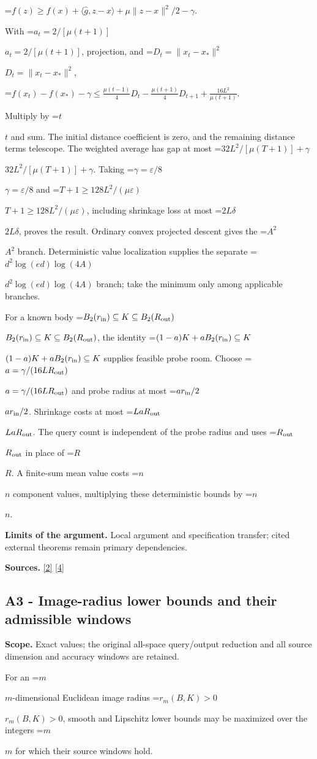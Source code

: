 \documentclass[10pt,a4paper]{article}
\newcommand{\AtlasMath}[1]{\par\begingroup\centering\setbox0=\hbox{$\displaystyle #1$}\ifdim\wd0>1.4\linewidth\typeout{ATLAS WIDE FORMULA: \the\wd0}\fi\ifdim\wd0>\linewidth\resizebox{\linewidth}{!}{\box0}\else\box0\fi\par\endgroup}
\newcommand{\AtlasInlineMath}[1]{\begingroup\setbox0=\hbox{$#1$}\ifdim\wd0>.4\linewidth\endgroup\AtlasMath{#1}\else\endgroup$#1$\fi}
\begin{document}
\AtlasMath{f(z)\ge f(x)+\langle\widehat g,z-x\rangle+\mu\|z-x\|^2/2-\gamma.}

With \AtlasInlineMath{a_t=2/[\mu(t+1)]}, projection, and \AtlasInlineMath{D_t=\|x_t-x_*\|^2},

\AtlasMath{f(x_t)-f(x_*)-\gamma\le\frac{\mu(t-1)}4D_t-\frac{\mu(t+1)}4D_{t+1}+\frac{16L^2}{\mu(t+1)}.}

Multiply by \AtlasInlineMath{t} and sum. The initial distance coefficient is zero, and the remaining distance terms telescope. The weighted average has gap at most \AtlasInlineMath{32L^2/[\mu(T+1)]+\gamma}. Taking \AtlasInlineMath{\gamma=\varepsilon/8} and \AtlasInlineMath{T+1\ge128L^2/(\mu\varepsilon)}, including shrinkage loss at most \AtlasInlineMath{2L\delta}, proves the result. Ordinary convex projected descent gives the \AtlasInlineMath{A^2} branch. Deterministic value localization supplies the separate \AtlasInlineMath{d^2\log(ed)\log(4A)} branch; take the minimum only among applicable branches.

For a known body \AtlasInlineMath{B_2(r_{\rm in})\subseteq K\subseteq B_2(R_{\rm out})}, the identity \AtlasInlineMath{(1-a)K+aB_2(r_{\rm in})\subseteq K} supplies feasible probe room. Choose \AtlasInlineMath{a=\gamma/(16LR_{\rm out})} and probe radius at most \AtlasInlineMath{ar_{\rm in}/2}. Shrinkage costs at most \AtlasInlineMath{LaR_{\rm out}}. The query count is independent of the probe radius and uses \AtlasInlineMath{R_{\rm out}} in place of \AtlasInlineMath{R}. A finite-sum mean value costs \AtlasInlineMath{n} component values, multiplying these deterministic bounds by \AtlasInlineMath{n}.

\textbf{Limits of the argument.} Local argument and specification transfer; cited external theorems remain primary dependencies.

\textbf{Sources.} \href{https://arxiv.org/html/2607.16558v2}{[2]} \href{https://www.mathnet.ru/php/archive.phtml?jrnid=mzm&option_lang=eng&paperid=1697&wshow=paper}{[4]}

\subsection{A3 - Image-radius lower bounds and their admissible windows}
\textbf{Scope.} Exact values; the original all-space query/output reduction and all source dimension and accuracy windows are retained.

For an \AtlasInlineMath{m}-dimensional Euclidean image radius \AtlasInlineMath{r_m(B,K)>0}, smooth and Lipschitz lower bounds may be maximized over the integers \AtlasInlineMath{m} for which their source windows hold.
\end{document}
